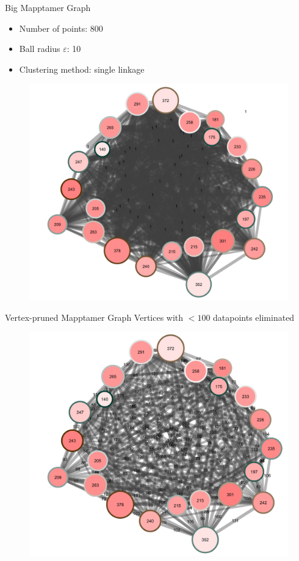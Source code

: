 \documentclass{beamer}
\begin{document}
\begin{frame}{Big Mapptamer Graph}
  \begin{itemize}
    \item Number of points: 800
    \item Ball radius $\varepsilon$: 10
    \item Clustering method: single linkage
  \end{itemize}
  \begin{figure}
    \begin{center}
      \includegraphics[width=.7\textwidth]{fullmaptamer.png}
    \end{center}
  \end{figure}
\end{frame}

\begin{frame}{Vertex-pruned Mapptamer Graph}
  Vertices with $<100$ datapoints eliminated
  \begin{figure}
    \begin{center}
      \includegraphics[width=.8\textwidth]{vertexpruned.png}
    \end{center}
  \end{figure}
\end{frame}
\end{document}
